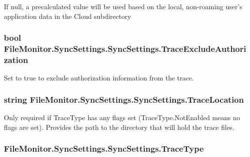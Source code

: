 If null, a precalculated value will be used based on the local, non-\/roaming user's application data in the Cloud subdirectory 

\hypertarget{class_file_monitor_1_1_sync_settings_1_1_sync_settings_a632e1de1bd05560e8664e710fd53cf05}{
\subsubsection[{Trace\-Exclude\-Authorization}]{\setlength{\rightskip}{0pt plus 5cm}bool File\-Monitor.\-Sync\-Settings.\-Sync\-Settings.\-Trace\-Exclude\-Authorization\hspace{0.3cm}{\ttfamily [get]}}}\label{class_file_monitor_1_1_sync_settings_1_1_sync_settings_a632e1de1bd05560e8664e710fd53cf05}


Set to true to exclude authorization information from the trace. 

\hypertarget{class_file_monitor_1_1_sync_settings_1_1_sync_settings_a4206b1a552e8ade9c6442b9e3e67d1ff}{
\subsubsection[{Trace\-Location}]{\setlength{\rightskip}{0pt plus 5cm}string File\-Monitor.\-Sync\-Settings.\-Sync\-Settings.\-Trace\-Location\hspace{0.3cm}{\ttfamily [get]}}}\label{class_file_monitor_1_1_sync_settings_1_1_sync_settings_a4206b1a552e8ade9c6442b9e3e67d1ff}


Only required if Trace\-Type has any flags set (Trace\-Type.\-Not\-Enabled means no flags are set). Provides the path to the directory that will hold the trace files. 

\hypertarget{class_file_monitor_1_1_sync_settings_1_1_sync_settings_a8308cc7db6b010431466936685dc1914}{
\subsubsection[{Trace\-Type}]{ File\-Monitor.\-Sync\-Settings.\-Sync\-Settings.\-Trace\-Type\hspace{0.3cm}{\ttfamily [get]}}}\label{class_file_monitor_1_1_sync_settings_1_1_sync_settings_a8308cc7db6b010431466936685dc1914}


